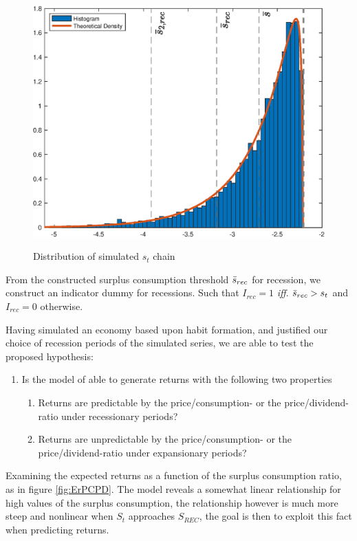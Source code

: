 \begin{figure}[H]
    \centering
    \caption{Distribution of simulated $s_t$ chain}
    \includegraphics[width=\textwidth]{Figures/DistributionS_t.eps}
    \label{fig:DistriSt}
\end{figure}
From the constructed surplus consumption threshold $\Bar{s}_{rec}$ for recession, we construct an indicator dummy for recessions. Such that $I_{rec} = 1$ \textit{iff}. $\Bar{s}_{rec} > s_t$ and $I_{rec}=0$ otherwise.

Having simulated an economy based upon habit formation, and justified our choice of recession periods of the simulated series, we are able to test the proposed hypothesis:
\begin{enumerate}
    \item Is the model of \citet{Campbell1999} able to generate returns with the following two properties
    \begin{enumerate}
        \item Returns are predictable by the price/consumption- or the price/dividend-ratio under recessionary periods?
        \item Returns are unpredictable by the price/consumption- or the price/dividend-ratio under expansionary periods?
    \end{enumerate}
\end{enumerate}
Examining the expected returns as a function of the surplus consumption ratio, as in figure \ref{fig:ErPCPD}. The model reveals a somewhat linear relationship for high values of the surplus consumption, the relationship however is much more steep and nonlinear when $S_t$ approaches ${S}_{REC}$, the goal is then to exploit this fact when predicting returns.


